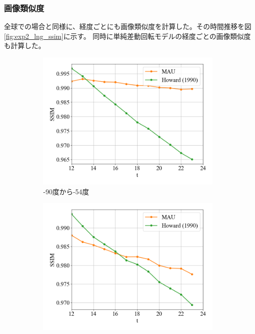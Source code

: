         \subsubsection{画像類似度}
          全球での場合と同様に、経度ごとにも画像類似度を計算した。その時間推移を図\ref{fig:exp2_lng_ssim}に示す。
          同時に単純差動回転モデルの経度ごとの画像類似度も計算した。
          \begin{figure}[htbp]
            \begin{subfigure}{0.5\textwidth}
              \centering
              \includegraphics[width=\textwidth]{figures/exp2/lng_ssim_1.png}
              \caption{-90度から-54度}
            \end{subfigure}
            \begin{subfigure}{0.5\textwidth}
              \centering
              \includegraphics[width=\textwidth]{figures/exp2/lng_ssim_2.png}

\end{subfigure}
\end{figure}

